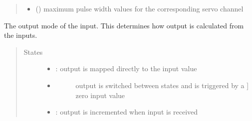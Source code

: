 \documentclass[letterpaper,10pt,english]{sphinxmanual}
\begin{document}
\begin{fulllineitems}
\begin{fulllineitems}
\begin{quote}
\begin{description}
\begin{itemize}
\item {} 
\sphinxAtStartPar
{} (\sphinxstyleliteralemphasis{\sphinxupquote{{[}}}\sphinxstyleliteralemphasis{\sphinxupquote{{]}}}) \textendash{} maximum pulse width values for the corresponding 
servo channel

\end{itemize}

\end{description}\end{quote}

\end{fulllineitems}


\end{fulllineitems}


\begin{fulllineitems}
\label{\detokenize{base:OutputObject.ControlType}}
\sphinxAtStartPar
The output mode of the input. This determines how output is calculated 
from the inputs.
\begin{quote}\begin{description}
\item[{States}] \leavevmode\begin{itemize}
\item {} 
\sphinxAtStartPar
{} : output is mapped directly to the input value

\item {} \begin{description}
\item[{}] \leavevmode{[}output is switched between states and is triggered by a {]}
\sphinxAtStartPar
zero input value

\end{description}

\item {} 
\sphinxAtStartPar
{} : output is incremented when input is received

\end{itemize}

\end{description}\end{quote}

\end{fulllineitems}
\end{document}
